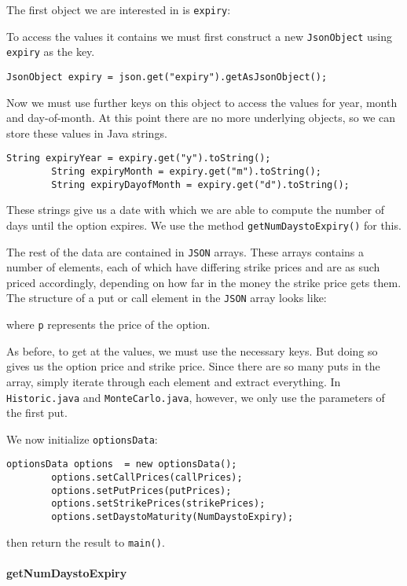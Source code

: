 \documentclass[../Dissertation.tex]{subfiles}
\begin{document}
The first object we are interested in is \lstinline|expiry|:

To access the values it contains we must first construct a new \lstinline|JsonObject| using \lstinline|expiry| as the key.
\begin{lstlisting}[firstnumber = 48]
JsonObject expiry = json.get("expiry").getAsJsonObject();
\end{lstlisting}
Now we must use further keys on this object to access the values for year, month and day-of-month.
At this point there are no more underlying objects, so we can store these values in Java strings.
\begin{lstlisting}[firstnumber = 49]
        String expiryYear = expiry.get("y").toString();
        String expiryMonth = expiry.get("m").toString();
        String expiryDayofMonth = expiry.get("d").toString();
\end{lstlisting}
These strings give us a date with which we are able to compute the number of days until the option expires.
We use the method \lstinline|getNumDaystoExpiry()| for this.

The rest of the data are contained in \lstinline|JSON| arrays.
These arrays contains a number of elements, each of which have differing strike prices and are as such priced accordingly, depending on how far in the money the strike price gets them.
The structure of a put or call element in the \lstinline|JSON| array looks like:

where \lstinline|p| represents the price of the option. 

As before, to get at the values, we must use the necessary keys.
But doing so gives us the option price and strike price. 
Since there are so many puts in the array, simply iterate through each element and extract everything.
In \lstinline|Historic.java| and \lstinline|MonteCarlo.java|, however, we only use the parameters of the first put.

We now initialize \lstinline|optionsData|:
\begin{lstlisting}[firstnumber = 84]
        optionsData options  = new optionsData();
        options.setCallPrices(callPrices);
        options.setPutPrices(putPrices);
        options.setStrikePrices(strikePrices);
        options.setDaystoMaturity(NumDaystoExpiry);
\end{lstlisting}
then return the result to \lstinline|main()|. 

\paragraph{getNumDaystoExpiry}
\end{document}
